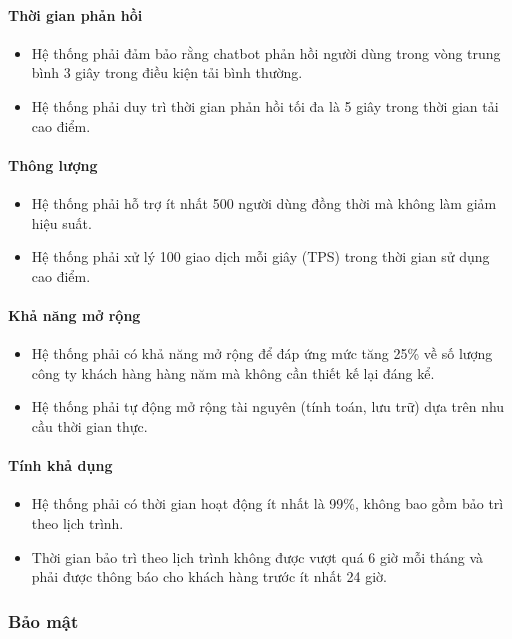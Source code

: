\paragraph{Thời gian phản hồi}
\begin{itemize}
    \item Hệ thống phải đảm bảo rằng chatbot phản hồi người dùng trong vòng trung bình 3 giây trong điều kiện tải bình thường.
    \item Hệ thống phải duy trì thời gian phản hồi tối đa là 5 giây trong thời gian tải cao điểm.
\end{itemize}

\paragraph{Thông lượng}
\begin{itemize}
    \item Hệ thống phải hỗ trợ ít nhất 500 người dùng đồng thời mà không làm giảm hiệu suất.
    \item Hệ thống phải xử lý 100 giao dịch mỗi giây (TPS) trong thời gian sử dụng cao điểm.
\end{itemize}

\paragraph{Khả năng mở rộng}
\begin{itemize}
    \item Hệ thống phải có khả năng mở rộng để đáp ứng mức tăng 25\% về số lượng công ty khách hàng hàng năm mà không cần thiết kế lại đáng kể.
    \item Hệ thống phải tự động mở rộng tài nguyên (tính toán, lưu trữ) dựa trên nhu cầu thời gian thực.
\end{itemize}

\paragraph{Tính khả dụng}
\begin{itemize}
    \item Hệ thống phải có thời gian hoạt động ít nhất là 99\%, không bao gồm bảo trì theo lịch trình.
    \item Thời gian bảo trì theo lịch trình không được vượt quá 6 giờ mỗi tháng và phải được thông báo cho khách hàng trước ít nhất 24 giờ.
\end{itemize}

\subsubsection{Bảo mật}

